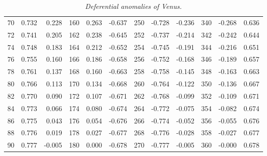 \begin{table}
{\begin{tabular}{rrr|rrr|rrr|rrr}
 70 &   0.732 &  0.228 & 160 &   0.263 & -0.637 & 250 &  -0.728 & -0.236 & 340 &  -0.268 &  0.636\\
 72 &   0.741 &  0.205 & 162 &   0.238 & -0.645 & 252 &  -0.737 & -0.214 & 342 &  -0.242 &  0.644\\
 74 &   0.748 &  0.183 & 164 &   0.212 & -0.652 & 254 &  -0.745 & -0.191 & 344 &  -0.216 &  0.651\\
 76 &   0.755 &  0.160 & 166 &   0.186 & -0.658 & 256 &  -0.752 & -0.168 & 346 &  -0.189 &  0.657\\
 78 &   0.761 &  0.137 & 168 &   0.160 & -0.663 & 258 &  -0.758 & -0.145 & 348 &  -0.163 &  0.663\\
 80 &   0.766 &  0.113 & 170 &   0.134 & -0.668 & 260 &  -0.764 & -0.122 & 350 &  -0.136 &  0.667\\
 82 &   0.770 &  0.090 & 172 &   0.107 & -0.671 & 262 &  -0.768 & -0.099 & 352 &  -0.109 &  0.671\\
 84 &   0.773 &  0.066 & 174 &   0.080 & -0.674 & 264 &  -0.772 & -0.075 & 354 &  -0.082 &  0.674\\
 86 &   0.775 &  0.043 & 176 &   0.054 & -0.676 & 266 &  -0.774 & -0.052 & 356 &  -0.055 &  0.676\\
 88 &   0.776 &  0.019 & 178 &   0.027 & -0.677 & 268 &  -0.776 & -0.028 & 358 &  -0.027 &  0.677\\
 90 &   0.777 & -0.005 & 180 &   0.000 & -0.678 & 270 &  -0.777 & -0.005 & 360 &  -0.000 &  0.678\\
\end{tabular}}
\caption{\em Deferential anomalies of Venus.}\label{vt18}
\end{table}

